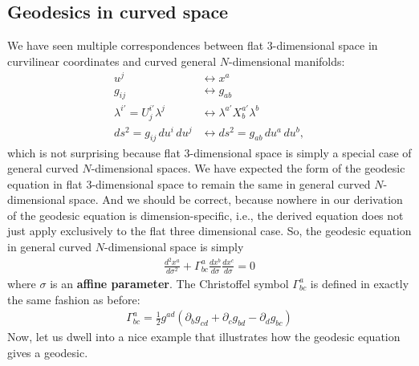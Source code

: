 \documentclass{article}
\theoremstyle{definition}
\begin{document}
\subsection{Geodesics in curved space}
We have seen multiple correspondences between flat 3-dimensional space in curvilinear coordinates and curved general $N$-dimensional manifolds:
\begin{align*}
u^j &\leftrightarrow x^a\\
g_{ij} &\leftrightarrow g_{ab}\\
\lambda^{i'} = U^{i'}_j\lambda^j &\leftrightarrow \lambda^{a'}X^{a'}_b\lambda^b\\
ds^2 = g_{ij}\,du^i\,du^j &\leftrightarrow ds^2 = g_{ab}\,du^a\,du^b,
\end{align*} 
which is not surprising because flat 3-dimensional space is simply a special case of general curved $N$-dimensional spaces. We have expected the form of the geodesic equation in flat 3-dimensional space to remain the same in general curved $N$-dimensional space. And we should be correct, because nowhere in our derivation of the geodesic equation is dimension-specific, i.e., the derived equation does not just apply exclusively to the flat three dimensional case. So, the geodesic equation in general curved $N$-dimensional space is simply
\begin{align*}
\boxed{\frac{d^2x^a}{d\sigma^2} + \Gamma^{a}_{bc}\frac{dx^b}{d\sigma}\frac{dx^c}{d\sigma} = 0}
\end{align*} 
where $\sigma$ is an \textbf{affine parameter}. The Christoffel symbol $\Gamma^{a}_{bc}$ is defined in exactly the same fashion as before:
\begin{align*}
\boxed{\Gamma^{a}_{bc} = \frac{1}{2}g^{ad}\left( \partial_b g_{cd} + \partial_c g_{bd} - \partial_d g_{bc}\right)}
\end{align*}
Now, let us dwell into a nice example that illustrates how the geodesic equation gives a geodesic. 
\end{document}
